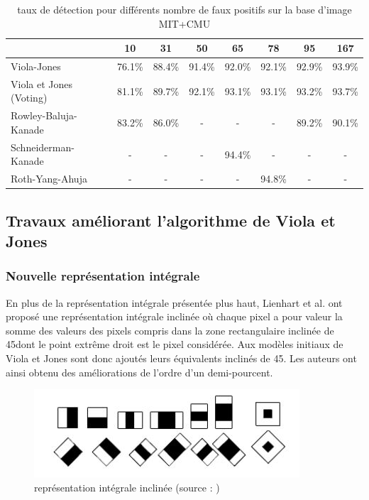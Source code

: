 \begin{table}[htbp]
	\centering
		\begin{tabular}{|l|c|c|c|c|c|c|c|}
			\hline	\backslashbox{d\'{e}tecteur}{faux positifs} & 10 & 31 & 50 & 65 & 78 & 95 & 167 \\
			\hline  Viola-Jones       & 76.1\% & 88.4\% & 91.4\% &92.0\% &92.1\%& 92.9\% &93.9\% \\
			\hline	Viola et Jones (Voting)& 81.1\% & 89.7\% & 92.1\% &93.1\% &93.1\%& 93.2\% &93.7\% \\
			\hline	Rowley-Baluja-Kanade   & 83.2\% & 86.0\% & -& - & - & 89.2\% & 90.1\%\\
			\hline	Schneiderman-Kanade     & - & -& - & 94.4\% & - & -  & -\\	
			\hline	Roth-Yang-Ahuja     & - & -& - & - & 94.8\%  &-   & -\\	
			\hline
		\end{tabular}
	\caption[taux de détection pour différents nombre de faux positifs sur la base d'image MIT+CMU]{taux de détection pour différents nombre de faux positifs sur la base d'image MIT+CMU}
	\label{tab:tauxDeDétection}
\end{table}
\subsection{Travaux améliorant l'algorithme de Viola et Jones}
\subsubsection{Nouvelle représentation intégrale}
  En plus de la représentation intégrale présentée plus haut, Lienhart et al. ont proposé une représentation intégrale inclinée où chaque pixel a pour valeur la somme des valeurs des pixels compris dans la zone rectangulaire inclinée de 45\degres dont le point extrême droit est le pixel considérée. Aux modèles initiaux de Viola et Jones sont donc ajoutés leurs équivalents inclinés de 45\degres. Les auteurs ont ainsi obtenu des améliorations de l'ordre d'un demi-pourcent.
	
	\begin{figure}[htbp]
		\centering
			\includegraphics{haaram.JPG}
		\caption[représentation intégrale inclinée]{représentation intégrale inclinée (source : \cite{MAT}) }
		\label{fig:haaram}
	\end{figure}
	
